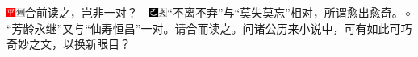 
{{\includegraphics[width=3mm]{../Images/00002}\includegraphics[width=3mm]{../Images/00011}\footnotesize \kaishu 合前读之，岂非一对？　}\includegraphics[width=3mm]{../Images/00003}\includegraphics[width=3mm]{../Images/00012}\footnotesize \kaishu “不离不弃”与“莫失莫忘”相对，所谓愈出愈奇。{$\diamond$}“芳龄永继”又与“仙寿恒昌”一对。请合而读之。问诸公历来小说中，可有如此可巧奇妙之文，以换新眼目？}

